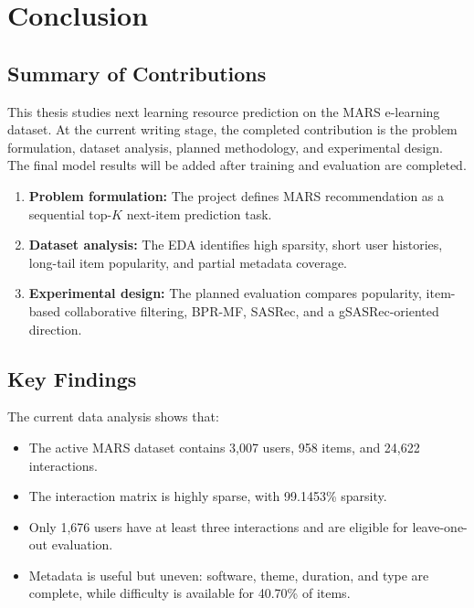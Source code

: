 
\section{Conclusion}

\subsection{Summary of Contributions}

This thesis studies next learning resource prediction on the MARS e-learning dataset. At the current writing stage, the completed contribution is the problem formulation, dataset analysis, planned methodology, and experimental design. The final model results will be added after training and evaluation are completed.

\begin{enumerate}
    \item \textbf{Problem formulation:} The project defines MARS recommendation as a sequential top-$K$ next-item prediction task.
    \item \textbf{Dataset analysis:} The EDA identifies high sparsity, short user histories, long-tail item popularity, and partial metadata coverage.
    \item \textbf{Experimental design:} The planned evaluation compares popularity, item-based collaborative filtering, BPR-MF, SASRec, and a gSASRec-oriented direction.
\end{enumerate}

\subsection{Key Findings}

The current data analysis shows that:

\begin{itemize}
    \item The active MARS dataset contains 3,007 users, 958 items, and 24,622 interactions.
    \item The interaction matrix is highly sparse, with 99.1453\% sparsity.
    \item Only 1,676 users have at least three interactions and are eligible for leave-one-out evaluation.
    \item Metadata is useful but uneven: software, theme, duration, and type are complete, while difficulty is available for 40.70\% of items.
\end{itemize}

